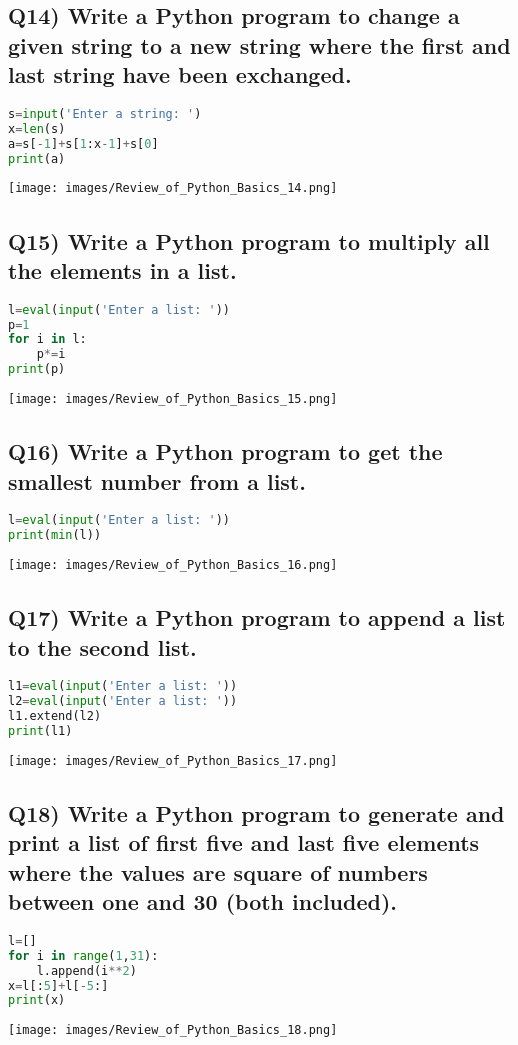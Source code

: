 \documentclass{article}
\begin{document}
\subsection*{Q14) Write a Python program to change a given string to a new string where the first and last string have been exchanged.}
\begin{lstlisting}[language=Python]
s=input('Enter a string: ')
x=len(s)
a=s[-1]+s[1:x-1]+s[0]
print(a)
\end{lstlisting}
\texttt{[image: images/Review\_of\_Python\_Basics\_14.png]}

\subsection*{Q15) Write a Python program to multiply all the elements in a list.}
\begin{lstlisting}[language=Python]
l=eval(input('Enter a list: '))
p=1
for i in l:
    p*=i
print(p)
\end{lstlisting}
\texttt{[image: images/Review\_of\_Python\_Basics\_15.png]}

\subsection*{Q16) Write a Python program to get the smallest number from a list.}
\begin{lstlisting}[language=Python]
l=eval(input('Enter a list: '))
print(min(l))
\end{lstlisting}
\texttt{[image: images/Review\_of\_Python\_Basics\_16.png]}

\subsection*{Q17) Write a Python program to append a list to the second list.}
\begin{lstlisting}[language=Python]
l1=eval(input('Enter a list: '))
l2=eval(input('Enter a list: '))
l1.extend(l2)
print(l1)
\end{lstlisting}
\texttt{[image: images/Review\_of\_Python\_Basics\_17.png]}

\subsection*{Q18) Write a Python program to generate and print a list of first five and last five elements where the values are square of numbers between one and 30 (both included).}
\begin{lstlisting}[language=Python]
l=[]
for i in range(1,31):
    l.append(i**2)
x=l[:5]+l[-5:]
print(x)
\end{lstlisting}
\texttt{[image: images/Review\_of\_Python\_Basics\_18.png]}
\end{document}
